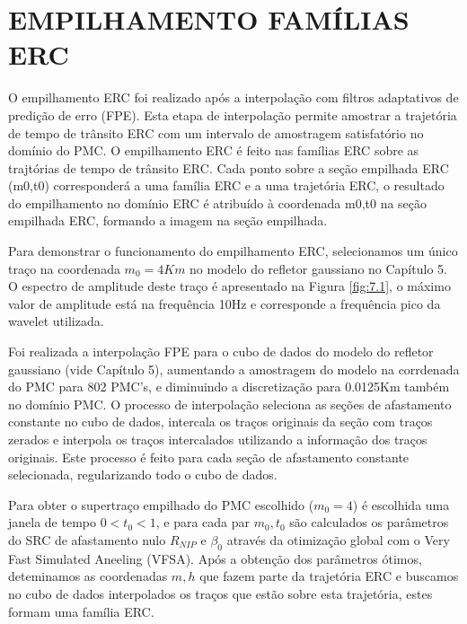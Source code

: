 %
% 
% 
% 
% 
% 
% 

\chapter{EMPILHAMENTO FAMÍLIAS ERC}

O empilhamento ERC foi realizado após a interpolação com filtros adaptativos de predição de erro (FPE). Esta etapa de
interpolação permite amostrar a trajetória de tempo de trânsito ERC com um intervalo de amostragem satisfatório no
domínio do PMC. O empilhamento ERC é feito nas famílias ERC sobre as trajtórias de tempo de trânsito ERC. Cada ponto sobre
a seção empilhada ERC (m0,t0) corresponderá a uma família ERC e a uma trajetória ERC, o resultado do empilhamento no domínio
ERC é atribuído à coordenada m0,t0 na seção empilhada ERC, formando a imagem na seção empilhada.

Para demonstrar o funcionamento do empilhamento ERC, selecionamos um único traço na coordenada $m_0=4Km$ no modelo do refletor
gaussiano no Capítulo 5. O espectro de amplitude deste traço é apresentado na Figura \ref{fig:7.1}, o máximo valor de amplitude 
está na frequência 10Hz e corresponde a frequência pico da wavelet utilizada.


Foi realizada a interpolação FPE para o cubo de dados do modelo do refletor gaussiano (vide Capítulo 5), aumentando a amostragem
do modelo na corrdenada do PMC para 802 PMC's, e diminuindo a discretização para 0.0125Km também no domínio PMC. O processo 
de interpolação seleciona as seções de afastamento constante no cubo de dados, intercala os traços originais da seção com traços 
zerados e interpola os traços intercalados utilizando a informação dos traços originais. Este processo é feito para cada seção
de afastamento constante selecionada, regularizando todo o cubo de dados.

Para obter o supertraço empilhado do PMC escolhido ($m_0=4$) é escolhida uma janela de tempo $0<t_0<1$, e para cada par $m_0,t_0$
são calculados os parâmetros do SRC de afastamento nulo $R_{NIP}$ e $\beta_0$ através da otimização global com o Very Fast
Simulated Aneeling (VFSA). Após a obtenção dos parâmetros ótimos, deteminamos as coordenadas $m,h$ que fazem parte da trajetória ERC
e buscamos no cubo de dados interpolados os traços que estão sobre esta trajetória, estes formam uma família ERC.

